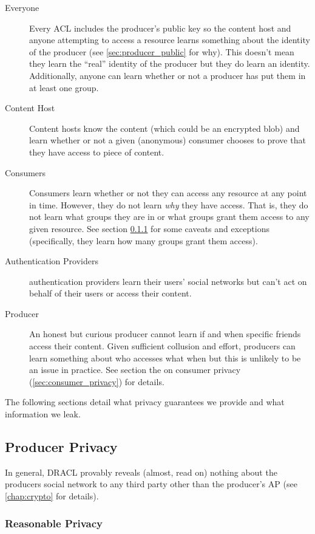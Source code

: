 \documentclass[pdftex,12pt,a4papaer,twoside,notitlepage]{report}
\begin{document}
\begin{description}
\item[Everyone] Every ACL includes the producer's public key so the content host
  and anyone attempting to access a resource learns something about the identity
  of the producer (see \cref{sec:producer_public} for why). This doesn't mean
  they learn the ``real'' identity of the producer but they do learn an
  identity. Additionally, anyone can learn whether or not a producer has put
  them in at least one group.
\item[Content Host] Content hosts know the content (which could be an encrypted
  blob) and learn whether or not a given (anonymous) consumer chooses to prove
  that they have access to piece of content.
\item[Consumers] Consumers learn whether or not they can access any resource at
  any point in time. However, they do not learn \emph{why} they have access.
  That is, they do not learn what groups they are in or what groups grant them
  access to any given resource. See section \cref{sec:resonable_privacy} for
  some caveats and exceptions (specifically, they learn how many groups grant
  them access).
\item[Authentication Providers] authentication providers learn their users'
  social networks but can't act on behalf of their users or access their
  content.
\item[Producer] An honest but curious producer cannot learn if and when specific
  friends access their content. Given sufficient collusion and effort, producers
  can learn something about who accesses what when but this is unlikely to be an
  issue in practice. See section the on consumer privacy
  (\cref{sec:consumer_privacy}) for details.
\end{description}

The following sections detail what privacy guarantees we provide and what
information we leak.

\subsection{Producer Privacy}
\label{sec:producer_privacy}

In general, DRACL provably reveals (almost, read on) nothing about the producers
social network to any third party other than the producer's AP (see
\cref{chap:crypto} for details).

\subsubsection{Reasonable Privacy}
\label{sec:resonable_privacy}
\end{document}
